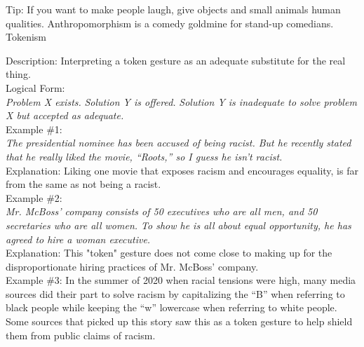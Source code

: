 \documentclass[a4paper,12pt,single,pdftex]{scrartcl}
\begin{document}
    
      Tip: If you want to make people laugh, give objects and small animals human qualities. Anthropomorphism is a comedy goldmine for stand-up comedians.
    \\

  

Tokenism
    
      
        Description: Interpreting a token gesture as an adequate substitute for the real thing.
      \\

      
        Logical Form:
      \\

      
        {\em Problem X exists.} \newline
{\em Solution Y is offered.} \newline
{\em Solution Y is inadequate to solve problem X but accepted as adequate.}
      \\

      
        Example \#1:
      \\

      
        {\em The presidential nominee has been accused of being racist.  But he recently stated that he really liked the movie, “Roots,” so I guess he isn’t racist.}
      \\

      
        Explanation: Liking one movie that exposes racism and encourages equality, is far from the same as not being a racist.
      \\

      
        Example \#2:
      \\

      
        {\em Mr. McBoss' company consists of 50 executives who are all men, and 50 secretaries who are all women.  To show he is all about equal opportunity, he has agreed to hire a woman executive.}
      \\

      
        Explanation: This "token" gesture does not come close to making up for the disproportionate hiring practices of Mr. McBoss' company.
      \\

      
        Example \#3: In the summer of 2020 when racial tensions were high, many media sources did their part to solve racism by capitalizing the “B” when referring to black people while keeping the “w” lowercase when referring to white people. Some sources that picked up this story saw this as a token gesture to help shield them from public claims of racism.
      \\
\end{document}
